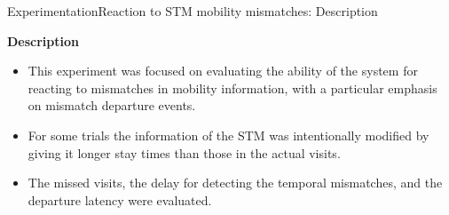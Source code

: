 
\begin{frame}{Experimentation}{Reaction to STM mobility mismatches: Description}
\begin{block}{\small \textbf{Description}}
{ 
\small
\begin{itemize}
  \item This experiment was focused on evaluating the ability of the system for reacting to mismatches in mobility information, with a particular emphasis on mismatch departure events.
  \item For some trials the information of the STM was intentionally modified by giving it longer stay times than those in the actual visits.
  \item The missed visits, the delay for detecting the temporal mismatches, and the departure latency were evaluated.
\end{itemize}
}
\end{block}

\begin{table}
\centering
\renewcommand{\arraystretch}{0.8}
\end{table}
\end{frame}

